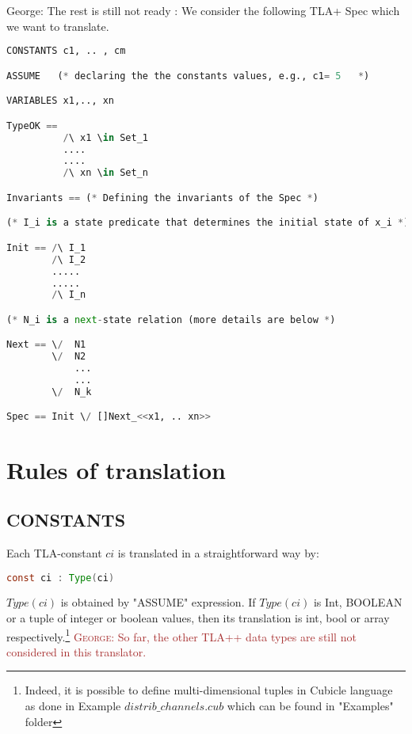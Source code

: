 \documentclass{article}
\theoremstyle{plain}
\numberwithin{equation}{section}
\newcommand{\george}[1]{\textcolor{brown}{\textsc{George: } {\sf #1}}}
\begin{document}
\iffalse    




\color{red} George: The rest is still not ready : 
We consider the following TLA+ Spec which we want to translate.

\begin{lstlisting}[language=Python]
CONSTANTS c1, .. , cm

ASSUME   (* declaring the the constants values, e.g., c1= 5   *)  

VARIABLES x1,.., xn

TypeOK == 
          /\ x1 \in Set_1
          ....
          ....
          /\ xn \in Set_n

Invariants == (* Defining the invariants of the Spec *)           

(* I_i is a state predicate that determines the initial state of x_i *)

Init == /\ I_1    
        /\ I_2 
        .....
        .....
        /\ I_n 

(* N_i is a next-state relation (more details are below *)

Next == \/  N1 
        \/  N2 
            ...
            ...
        \/  N_k 

Spec == Init \/ []Next_<<x1, .. xn>>        
\end{lstlisting}
 

\section*{Rules of translation}

 







\subsection{CONSTANTS} Each TLA-constant $ci$ is  translated in a straightforward  way  by:  
   
\begin{lstlisting}[language=Java]
const ci : Type(ci) 
\end{lstlisting}

\emph{$Type(ci)$} is obtained by "ASSUME" expression. If \emph{$Type(ci)$} is Int, BOOLEAN or a tuple of integer or boolean values, then its translation is int,  bool or array respectively.\footnote{Indeed, it is possible to define multi-dimensional tuples in Cubicle language as done in Example \emph{$distrib\_channels.cub$} which can be found in "Examples" folder} \george{So far, the other TLA++ data types are still not considered in this translator.  }  
\end{document}

